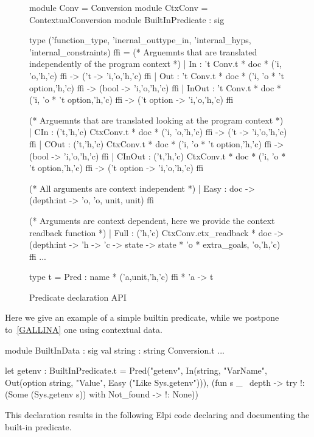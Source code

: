 \documentclass[a4paper, 11pt]{book}
\begin{document}
\begin{figure}
\begin{ocamlcode}
module Conv = Conversion
module CtxConv = ContextualConversion
module BuiltInPredicate : sig

type ('function_type, 'inernal_outtype_in, 'internal_hyps, 'internal_constraints) ffi =
  (* Arguemnts that are translated independently of the program context *)
  | In    : 't Conv.t * doc * ('i, 'o,'h,'c) ffi -> ('t -> 'i,'o,'h,'c) ffi
  | Out   : 't Conv.t * doc * ('i, 'o * 't option,'h,'c) ffi -> (bool -> 'i,'o,'h,'c) ffi
  | InOut : 't Conv.t * doc * ('i, 'o * 't option,'h,'c) ffi -> ('t option -> 'i,'o,'h,'c) ffi

  (* Arguemnts that are translated looking at the program context *)
  | CIn    : ('t,'h,'c) CtxConv.t * doc * ('i, 'o,'h,'c) ffi -> ('t -> 'i,'o,'h,'c) ffi
  | COut   : ('t,'h,'c) CtxConv.t * doc * ('i, 'o * 't option,'h,'c) ffi -> (bool -> 'i,'o,'h,'c) ffi
  | CInOut : ('t,'h,'c) CtxConv.t * doc * ('i, 'o * 't option,'h,'c) ffi -> ('t option -> 'i,'o,'h,'c) ffi

  (* All arguments are context independent *)
  | Easy : doc -> (depth:int -> 'o, 'o, unit, unit) ffi

  (* Arguments are context dependent, here we provide the context readback function *)
  | Full : ('h,'c) CtxConv.ctx_readback * doc ->
     (depth:int -> 'h -> 'c -> state ->
        state * 'o * extra_goals, 'o,'h,'c) ffi
  ...

type t = Pred : name * ('a,unit,'h,'c) ffi * 'a -> t
\end{ocamlcode}
\caption{Predicate declaration API\label{fig:ffi}}
\end{figure}

Here we give an example of a simple builtin predicate, while we
postpone to~\cref{GALLINA} one using contextual data.

\begin{ocamlcode}
  module BuiltInData : sig
    val string : string Conversion.t
  ...

  let getenv : BuiltInPredicate.t =
    Pred("getenv",
      In(string,  "VarName",
      Out(option string, "Value",
      Easy ("Like Sys.getenv"))),
       (fun s _ ~depth ->
          try !:(Some (Sys.getenv s))
          with Not_found -> !: None))
\end{ocamlcode}

\noindent
This declaration results in the following Elpi code declaring and documenting
the built-in predicate.
\end{document}
